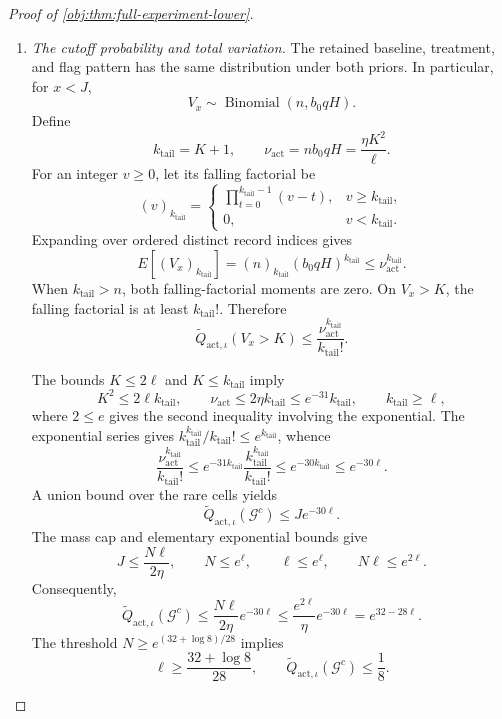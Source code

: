 \begin{proof}[Proof of \cref{obj:thm:full-experiment-lower}]
\begin{enumerate}
\item \emph{The cutoff probability and total variation.}
The retained baseline, treatment, and flag pattern has the same distribution
under both priors. In particular, for \(x<J\),
\[
V_x\sim\operatorname{Binomial}(n,b_0qH).
\]
Define
\[
k_{\mathrm{tail}}=K+1,\qquad
\nu_{\mathrm{act}}=nb_0qH=\frac{\eta K^2}{\ell}.
\]
For an integer \(v\ge0\), let its falling factorial be
\[
(v)_{k_{\mathrm{tail}}}
=
\begin{cases}
\displaystyle\prod_{t=0}^{k_{\mathrm{tail}}-1}(v-t),
&v\ge k_{\mathrm{tail}},\\
0,&v<k_{\mathrm{tail}}.
\end{cases}
\]
Expanding over ordered distinct record indices gives
\[
E[(V_x)_{k_{\mathrm{tail}}}]
=(n)_{k_{\mathrm{tail}}}(b_0qH)^{k_{\mathrm{tail}}}
\le\nu_{\mathrm{act}}^{k_{\mathrm{tail}}}.
\]
When \(k_{\mathrm{tail}}>n\), both falling-factorial moments are zero.
On \(V_x>K\), the falling factorial is at least \(k_{\mathrm{tail}}!\).
Therefore
\[
\widetilde Q_{\mathrm{act},\iota}(V_x>K)
\le
\frac{\nu_{\mathrm{act}}^{k_{\mathrm{tail}}}}
{k_{\mathrm{tail}}!}.
\]

The bounds \(K\le2\ell\) and \(K\le k_{\mathrm{tail}}\) imply
\[
K^2\le2\ell k_{\mathrm{tail}},
\qquad
\nu_{\mathrm{act}}\le2\eta k_{\mathrm{tail}}
\le e^{-31}k_{\mathrm{tail}},
\qquad
k_{\mathrm{tail}}\ge\ell,
\]
where \(2\le e\) gives the second inequality involving the exponential.
The exponential series gives
\(k_{\mathrm{tail}}^{k_{\mathrm{tail}}}/k_{\mathrm{tail}}!
\le e^{k_{\mathrm{tail}}}\), whence
\[
\frac{\nu_{\mathrm{act}}^{k_{\mathrm{tail}}}}
{k_{\mathrm{tail}}!}
\le
e^{-31k_{\mathrm{tail}}}
\frac{k_{\mathrm{tail}}^{k_{\mathrm{tail}}}}
{k_{\mathrm{tail}}!}
\le e^{-30k_{\mathrm{tail}}}
\le e^{-30\ell}.
\]
A union bound over the rare cells yields
\[
\widetilde Q_{\mathrm{act},\iota}(\mathcal G^c)
\le Je^{-30\ell}.
\]
The mass cap and elementary exponential bounds give
\[
J\le\frac{N\ell}{2\eta},\qquad
N\le e^\ell,\qquad \ell\le e^\ell,\qquad
N\ell\le e^{2\ell}.
\]
Consequently,
\[
\widetilde Q_{\mathrm{act},\iota}(\mathcal G^c)
\le
\frac{N\ell}{2\eta}e^{-30\ell}
\le
\frac{e^{2\ell}}{\eta}e^{-30\ell}
=e^{32-28\ell}.
\]
The threshold \(N\ge e^{(32+\log8)/28}\) implies
\[
\ell\ge\frac{32+\log8}{28},
\qquad
\widetilde Q_{\mathrm{act},\iota}(\mathcal G^c)\le\frac18.
\]


\end{enumerate}
\end{proof}

